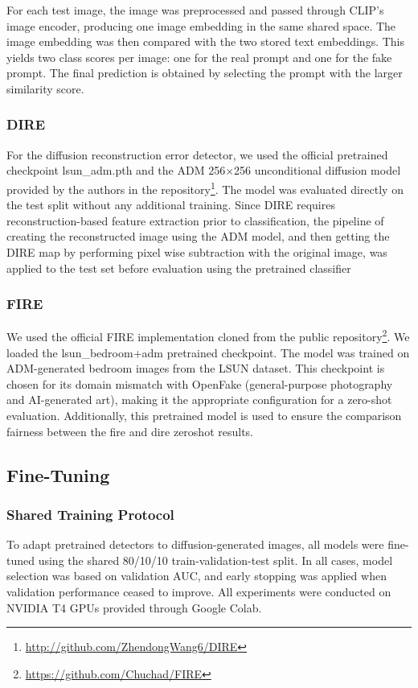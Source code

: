 For each test image, the image was preprocessed and passed through CLIP's image encoder, producing one image embedding in the same shared space. The image embedding was then compared with the two stored text embeddings. This yields two class scores per image: one for the real prompt and one for the fake prompt. The final prediction is obtained by selecting the prompt with the larger similarity score.

\subsubsection{DIRE}
\label{subsubsec:dire-zs}
For the diffusion reconstruction error detector, we used the official pretrained checkpoint lsun\_adm.pth and the ADM 256×256 unconditional diffusion model provided by the authors in the repository\footnote{\url{http://github.com/ZhendongWang6/DIRE}}. The model was evaluated directly on the test split without any additional training. Since DIRE requires reconstruction-based feature extraction prior to classification, the pipeline of creating the reconstructed image using the ADM model, and then getting the DIRE map by performing pixel wise subtraction with the original image, was applied to the test set before evaluation using the pretrained classifier

\subsubsection{FIRE}
\label{subsubsec:fire-zs}
We used the official FIRE implementation cloned from the public repository\footnote{\url{https://github.com/Chuchad/FIRE}}. We loaded the lsun\_bedroom+adm pretrained checkpoint. The model was trained on ADM-generated bedroom images from the LSUN dataset. This checkpoint is chosen for its domain mismatch with OpenFake (general-purpose photography and AI-generated art), making it the appropriate configuration for a zero-shot evaluation. Additionally, this pretrained model is used to ensure the comparison fairness between the fire and dire zeroshot results.

\subsection{Fine-Tuning}
\label{subsec:fine-tuning}

\subsubsection{Shared Training Protocol}
\label{subsubsec:shared-protocol}
To adapt pretrained detectors to diffusion-generated images, all models were fine-tuned using the shared 80/10/10 train-validation-test split. In all cases, model selection was based on validation AUC, and early stopping was applied when validation performance ceased to improve. All experiments were conducted on NVIDIA T4 GPUs provided through Google Colab.

